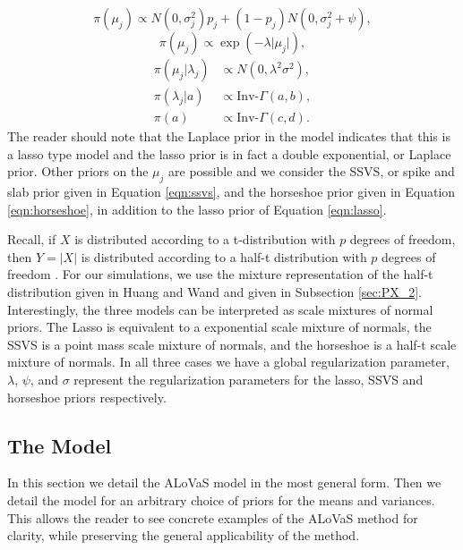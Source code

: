 \begin{equation}\label{eqn:ssvs}
\pi(\mu_j) \propto N(0,\sigma_j^2)p_j+(1-p_j)N(0,\sigma_j^2+\psi),
\end{equation}
\begin{equation}\label{eqn:lasso}
\pi(\mu_j) \propto \exp(-\lambda\vert \mu_j\vert),
\end{equation}
\begin{align}\label{eqn:horseshoe}
\pi(\mu_j\vert \lambda_j) &\propto N(0, \lambda^2\sigma^2),\\
\pi(\lambda_j | a)&\propto \text{Inv-}\Gamma(a,b),\nonumber \\ \nonumber
\pi(a)&\propto \text{Inv-}\Gamma(c,d).
\end{align}
The reader should note that the Laplace prior in the model indicates that this is a lasso type model and the lasso prior is in fact a double exponential, or Laplace prior. Other priors on the $\mu_j$ are possible and we consider the SSVS, or spike and slab prior given in Equation \ref{eqn:ssvs}, and the horseshoe prior given in Equation \ref{eqn:horseshoe}, in addition to the lasso prior of Equation \ref{eqn:lasso}. 

Recall, if $X$ is distributed according to a t-distribution with $p$ degrees of freedom, then $Y=\vert X\vert$ is distributed according to a half-t distribution with $p$ degrees of freedom \cite{johnson1995continuous}. For our simulations, we use the mixture representation of the half-t distribution given in Huang and Wand \cite{huang2013simple} and given in Subsection \ref{sec:PX_2}. Interestingly, the three models can be interpreted as scale mixtures of normal priors. The Lasso is equivalent to a exponential scale mixture of normals, the SSVS is a point mass scale mixture of normals, and the horseshoe is a half-t scale mixture of normals. In all three cases we have a global regularization parameter, $\lambda$, $\psi$, and $\sigma$ represent the regularization parameters for the lasso, SSVS and horseshoe priors respectively.    


\subsection{The Model}\label{sec:ALoVaS_model}

In this section we detail the ALoVaS model in the most general form. Then we detail the model for an arbitrary choice of priors for the means and variances. This allows the reader to see concrete examples of the ALoVaS method for clarity, while preserving the general applicability of the method. 

